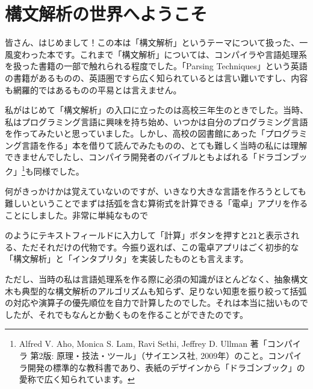 \hypertarget{chapter1-ux69cbux6587ux89e3ux6790ux306eux4e16ux754cux3078ux3088ux3046ux3053ux305d}{%
\chapter{構文解析の世界へようこそ}\label{chapter1-ux69cbux6587ux89e3ux6790ux306eux4e16ux754cux3078ux3088ux3046ux3053ux305d}}

皆さん、はじめまして！この本は「構文解析」というテーマについて扱った、一風変わった本です。これまで「構文解析」については、コンパイラや言語処理系を扱った書籍の一部で触れられる程度でした。「Parsing
Techniques」という英語の書籍があるものの、英語圏ですら広く知られているとは言い難いですし、内容も網羅的ではあるものの平易とは言えません。

私がはじめて「構文解析」の入口に立ったのは高校三年生のときでした。当時、私はプログラミング言語に興味を持ち始め、いつかは自分のプログラミング言語を作ってみたいと思っていました。しかし、高校の図書館にあった「プログラミング言語を作る」本を借りて読んでみたものの、とても難しく当時の私には理解できませんでしたし、コンパイラ開発者のバイブルともよばれる「ドラゴンブック」\footnote{Alfred
  V. Aho, Monica S. Lam, Ravi Sethi, Jeffrey D. Ullman 著「コンパイラ
  第2版: 原理・技法・ツール」（サイエンス社,
  2009年）のこと。コンパイラ開発の標準的な教科書であり、表紙のデザインから「ドラゴンブック」の愛称で広く知られています。}も同様でした。

何がきっかけかは覚えていないのですが、いきなり大きな言語を作ろうとしても難しいということでまずは括弧を含む算術式を計算できる「電卓」アプリを作ることにしました。非常に単純なもので

\begin{Shaded}
\begin{Highlighting}[]
\KeywordTok{(}\KeywordTok{)} \ExtensionTok{*}
\end{Highlighting}
\end{Shaded}

のようにテキストフィールドに入力して「計算」ボタンを押すと\texttt{21}と表示される、ただそれだけの代物です。今振り返れば、この電卓アプリはごく初歩的な「構文解析」と「インタプリタ」を実装したものとも言えます。

ただし、当時の私は言語処理系を作る際に必須の知識がほとんどなく、抽象構文木も典型的な構文解析のアルゴリズムも知らず、足りない知恵を振り絞って括弧の対応や演算子の優先順位を自力で計算したのでした。それは本当に拙いものでしたが、それでもなんとか動くものを作ることができたのです。

